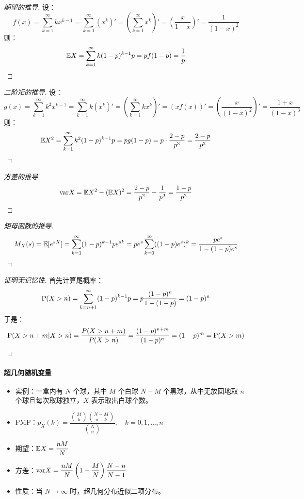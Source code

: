 \begin{proof}[期望的推导]
设：
\[
f(x)=\sum_{k=1}^\infty k x^{k-1}=\sum_{k=1}^\infty (x^k)'=\left(\sum_{k=1}^\infty x^k\right)'=\left(\frac{x}{1-x}\right)'=\frac{1}{(1-x)^2}
\]
则：
\[
\mathbb{E} X=\sum_{k=1}^\infty k(1-p)^{k-1}p=pf(1-p)=\frac{1}{p}
\]
\end{proof}
\begin{proof}[二阶矩的推导]
设：
\[
g(x)=\sum_{k=1}^\infty k^2x^{k-1}=\sum_{k=1}^\infty k(x^k)'=\left(\sum_{k=1}^\infty kx^k\right)'=(xf(x))'=\left(\frac{x}{(1-x)^2}\right)'=\frac{1+x}{(1-x)^3}
\]
则：
\[
\mathbb{E} X^2=\sum_{k=1}^\infty k^2(1-p)^{k-1}p=pg(1-p)=p\cdot\frac{2-p}{p^3}=\frac{2-p}{p^2}
\]
\end{proof}
\begin{proof}[方差的推导]
\[
\mathrm{var} X=\mathbb{E} X^2-(\mathbb{E} X)^2=\frac{2-p}{p^2}-\frac{1}{p^2}=\frac{1-p}{p^2}
\]
\end{proof}
\begin{proof}[矩母函数的推导]
\[
M_X(s)=\mathbb{E}[e^{sX}]=\sum_{k=1}^\infty(1-p)^{k-1}pe^{sk}=pe^s\sum_{k=0}^\infty((1-p)e^s)^{k}=\frac{pe^s}{1-(1-p)e^s}
\]
\end{proof}
\begin{proof}[证明无记忆性]
首先计算尾概率：
\[
\mathrm{P}(X>n)=\sum_{k=n+1}^\infty(1-p)^{k-1}p=p\frac{(1-p)^n}{1-(1-p)}=(1-p)^n
\]
于是：
\[
\mathrm{P}(X>n+m\vert X>n)=\frac{P(X>n+m)}{P(X>n)}=\frac{(1-p)^{n+m}}{(1-p)^n}=(1-p)^m=\mathrm{P}(X>m)
\]
\end{proof}

\paragraph{超几何随机变量}

\begin{itemize}[itemsep=1ex]
    \item 实例：一盒内有 $N$ 个球，其中 $M$ 个白球 $N-M$ 个黑球，从中无放回地取 $n$ 个球且每次取球独立，$X$ 表示取出白球个数。
    \item PMF：$p_X(k)=\dfrac{\binom{M}{k}\binom{N-M}{n-k}}{\binom{N}{n}},\quad k=0,1,\ldots,n$
    \item 期望：$\mathbb{E} X=\dfrac{nM}{N}$
    \item 方差：$\mathrm{var} X=\dfrac{nM}{N}\left(1-\dfrac{M}{N}\right)\dfrac{N-n}{N-1}$
    \item 性质：当 $N\to\infty$ 时，超几何分布近似二项分布。
\end{itemize}

